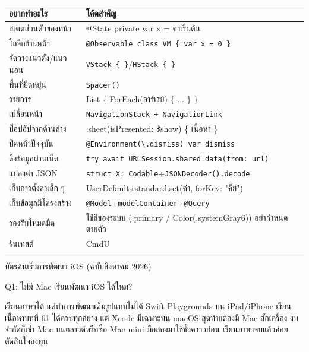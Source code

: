 


\begin{center}
\begin{tabularx}{\linewidth}{|X|X|}
\hline
\textbf{อยากทำอะไร} & \textbf{โค้ดสำคัญ} \tabularnewline
\hline
สเตตส่วนตัวของหน้า & @State private var x = ค่าเริ่มต้น \tabularnewline
โลจิกข้ามหน้า & \texttt{@Observable class VM \{ var x = 0 \}} \tabularnewline
จัดวางแนวตั้ง/แนวนอน & \texttt{VStack \{ \}}/\texttt{HStack \{ \}} \tabularnewline
พื้นที่ยืดหยุ่น & \texttt{Spacer()} \tabularnewline
รายการ & List \{ ForEach(อาร์เรย์) \{ ... \} \} \tabularnewline
เปลี่ยนหน้า & \texttt{NavigationStack + NavigationLink} \tabularnewline
ป๊อปอัปจากด้านล่าง & .sheet(isPresented: \$show) \{ เนื้อหา \} \tabularnewline
ปิดหน้าปัจจุบัน & \texttt{@Environment(\textbackslash{}.\allowbreak dismiss) var dismiss} \tabularnewline
ดึงข้อมูลผ่านเน็ต & \texttt{try await URLSession.\allowbreak shared.\allowbreak data(from: url)} \tabularnewline
แปลงค่า JSON & \texttt{struct X: Codable}+\texttt{JSONDecoder().\allowbreak decode} \tabularnewline
เก็บการตั้งค่าเล็ก ๆ & UserDefaults.standard.set(ค่า, forKey: "คีย์") \tabularnewline
เก็บข้อมูลมีโครงสร้าง & \texttt{@Model}+\texttt{modelContainer}+\texttt{@Query} \tabularnewline
รองรับโหมดมืด & ใช้สีของระบบ (.primary / Color(.systemGray6)) อย่ากำหนดตายตัว \tabularnewline
รันเทสต์ & CmdU \tabularnewline
\hline
\end{tabularx}
\end{center}

\begin{center}\small\color{gray}บัตรค้นเร็วการพัฒนา iOS (ฉบับสิงหาคม 2026)\end{center}


Q1: ไม่มี Mac เรียนพัฒนา iOS ได้ไหม?

เรียนภาษาได้ แต่ทำการพัฒนาเต็มรูปแบบไม่ได้ Swift Playgrounds บน iPad/iPhone เรียนเนื้อหาบทที่ 61 ได้ครบทุกอย่าง แต่ Xcode มีเฉพาะบน macOS สุดท้ายต้องมี Mac สักเครื่อง งบจำกัดก็เช่า Mac บนคลาวด์หรือซื้อ Mac mini มือสองมาใช้ชั่วคราวก่อน เรียนภาษาจบแล้วค่อยตัดสินใจลงทุน

